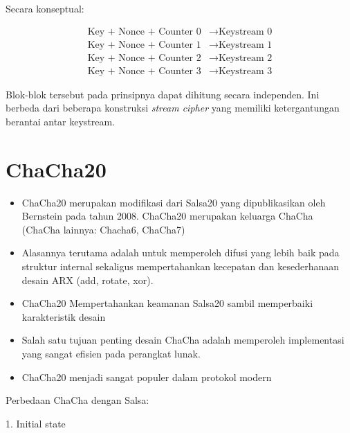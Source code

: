 \documentclass{article}
\begin{document}
Secara konseptual:

\begin{align*}
\text{Key + Nonce + Counter 0} & \rightarrow \text{Keystream 0} \\
\text{Key + Nonce + Counter 1} & \rightarrow \text{Keystream 1} \\
\text{Key + Nonce + Counter 2} & \rightarrow \text{Keystream 2} \\
\text{Key + Nonce + Counter 3} & \rightarrow \text{Keystream 3}
\end{align*}

Blok-blok tersebut pada prinsipnya dapat dihitung secara independen. Ini berbeda dari beberapa konstruksi \textit{stream cipher} yang memiliki ketergantungan berantai antar keystream.

\newpage


\section*{ChaCha20}

\begin{itemize}
    \item ChaCha20 merupakan modifikasi dari Salsa20 yang dipublikasikan oleh Bernstein pada tahun 2008. ChaCha20 merupakan keluarga ChaCha (ChaCha lainnya: Chacha6, ChaCha7)
    \item Alasannya terutama adalah untuk memperoleh difusi yang lebih baik pada struktur internal sekaligus mempertahankan kecepatan dan kesederhanaan desain ARX (add, rotate, xor).
    \item ChaCha20 Mempertahankan keamanan Salsa20 sambil memperbaiki karakteristik desain
    \item Salah satu tujuan penting desain ChaCha adalah memperoleh implementasi yang sangat efisien pada perangkat lunak.
    \item ChaCha20 menjadi sangat populer dalam protokol modern
\end{itemize}

\newpage


\vspace{280.37mm}

Perbedaan ChaCha dengan Salsa:

\vspace{76.63mm}

1. Initial state
\end{document}
